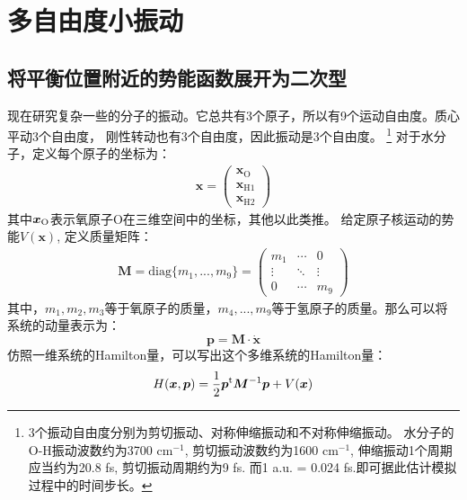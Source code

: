 \chapter{多自由度小振动}
    \section{将平衡位置附近的势能函数展开为二次型}
    现在研究复杂一些的分子的振动。它总共有3个原子，所以有9个运动自由度。质心平动3个自由度，
    刚性转动也有3个自由度，因此振动是3个自由度。
    \footnote{
    3个振动自由度分别为剪切振动、对称伸缩振动和不对称伸缩振动。
    水分子的O-H振动波数约为3700 cm$^{-1}$, 剪切振动波数约为1600 cm$^{-1}$, 
    伸缩振动1个周期应当约为20.8 fs, 剪切振动周期约为9 fs. 而1 a.u. = 0.024 fs.即可据此估计模拟过程中的时间步长。
    }
    对于水分子，定义每个原子的坐标为：
    \begin{equation}
        \begin{split}
        \bm{x} = 
        \begin{pmatrix}
            \bm{x}_\mathrm{O}\\
            \bm{x}_{\mathrm{H1}}\\
            \bm{x}_{\mathrm{H2}}
        \end{pmatrix}
    \end{split}
    \end{equation}
    其中$\bm{x}_{\mathrm{O}}$表示氧原子O在三维空间中的坐标，其他以此类推。
    给定原子核运动的势能$V(\bm{x})$, 定义质量矩阵：
    \begin{equation}
        \begin{split}
        \bm{M} = \mathrm{diag} \{m_1,...,m_9 \} = 
        \begin{pmatrix}
            m_1 & \cdots & 0\\
            \vdots & \ddots & \vdots\\
            0 & \cdots & m_9
        \end{pmatrix}
        \label{mass matrix}
    \end{split}
    \end{equation}
    其中，$m_1,m_2,m_3$等于氧原子的质量，$m_4,...,m_9$等于氢原子的质量。那么可以将
    系统的动量表示为：
    \begin{equation}
        \bm{p} = \bm{M}\cdot\dot{\bm{x}}
    \end{equation}
    仿照一维系统的Hamilton量，可以写出这个多维系统的Hamilton量：
    \begin{equation}
        H(\bm{x}, \bm{p}) = \frac{1}{2}\bm{p}^{\mathrm{t}}\bm{M}^{-1}\bm{p} + V(\bm{x})
    \end{equation}
